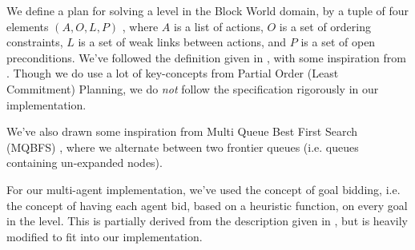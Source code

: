 \documentclass[Main]{subfiles}
\begin{document}

We define a plan for solving a level in the Block World domain, by a tuple of four elements $(A,O,L,P)$ \citep{Weld1994}\citep{Russell2003}, where $A$ is a list of actions, $O$ is a set of ordering constraints, $L$ is a set of weak links between actions, and $P$ is a set of open preconditions. 
We've followed the definition given in \cite{Russell2003}, with some inspiration from \cite{Weld1994}.
Though we do use a lot of key-concepts from Partial Order (Least Commitment) Planning, we do \textit{not} follow the specification rigorously in our implementation.

We've also drawn some inspiration from Multi Queue Best First Search (MQBFS) \citep[p.~38]{hector2013a}, where we alternate between two frontier queues (i.e. queues containing un-expanded nodes).

For our multi-agent implementation, we've used the concept of goal bidding, i.e. the concept of having each agent bid, based on a heuristic function, on every goal in the level.
This is partially derived from the description given in \cite{VanderKrogt2005}, but is heavily modified to fit into our implementation.

\end{document}
